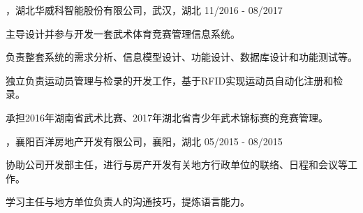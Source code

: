 
\begin{cventries}

\cvexperience
{，湖北华威科智能股份有限公司，武汉，湖北}
{11/2016 - 08/2017}
{
    \begin{cvitems}
    \item {主导设计并参与开发一套武术体育竞赛管理信息系统。}
    \item {负责整套系统的需求分析、信息模型设计、功能设计、数据库设计和功能测试等。}
    \item {独立负责运动员管理与检录的开发工作，基于RFID实现运动员自动化注册和检录。}
    \item {承担2016年湖南省武术比赛、2017年湖北省青少年武术锦标赛的竞赛管理。}
    \end{cvitems}
}

\cvexperience
{，襄阳百洋房地产开发有限公司，襄阳，湖北}
{05/2015 - 08/2015}
{
    \begin{cvitems}
    \item {协助公司开发部主任，进行与房产开发有关地方行政单位的联络、日程和会议等工作。}
    \item {学习主任与地方单位负责人的沟通技巧，提炼语言能力。}
    \end{cvitems}
}

\end{cventries}
